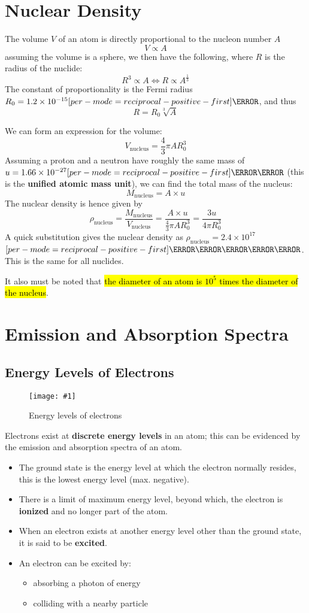 \documentclass[a4paper,12pt]{article}
\let\oldsection\section
\renewcommand\section{\clearpage\oldsection}
\let\oldsi\si
\renewcommand{\si}[1]{\oldsi[per-mode=reciprocal-positive-first]{#1}}
\newcommand{\img}[4]{\begin{center}
  \begin{figure}[H]
    \centering
    \texttt{[image: \#1]}
    \caption{#3}
    \label{fig:#4}
  \end{figure}
\end{center}}
\begin{document}
\section{Nuclear Density}

The volume $V$ of an atom is directly proportional to the nucleon number $A$
$$V \propto A$$
assuming the volume is a sphere, we then have the following, where $R$ is the radius of the nuclide:
$$R^3 \propto A \iff R \propto A^{\frac{1}{3}}$$
The constant of proportionality is the Fermi radius $R_0 = 1.2 \times 10^{-15}\si{\meter}$, and thus
$$R = R_0\sqrt[3]{A}$$

We can form an expression for the volume:
$$V_{\text{nucleus}} = \frac{4}{3}\pi A R_0^3$$
Assuming a proton and a neutron have roughly the same mass of $u = 1.66 \times 10^{-27}\si{\kilo\gram}$ (this is the \textbf{unified atomic mass unit}), we can find the total mass of the nucleus:
$$M_{\text{nucleus}} = A \times u$$
The nuclear density is hence given by
$$\rho_{\text{nucleus}} = \frac{M_{\text{nucleus}}}{V_{\text{nucleus}}} = \frac{A \times u}{\frac{4}{3}\pi A R_0^3} = \frac{3u}{4\pi R_0^3}$$
A quick substitution gives the nuclear density as $\rho_{\text{nucleus}} = 2.4 \times 10^{17}$ $\si{\kilo\gram\per\meter\cubed}$. This is the same for all nuclides.

It also must be noted that \hl{the diameter of an atom is $10^5$ times the diameter of the nucleus}.


\section{Emission and Absorption Spectra}

\subsection{Energy Levels of Electrons}

\img{energylevel.jpg}{0.5}{Energy levels of electrons}{energylevel}

Electrons exist at \textbf{discrete energy levels} in an atom; this can be evidenced by the emission and absorption spectra of an atom.
\begin{itemize}
  \item The ground state is the energy level at which the electron normally resides, this is the lowest energy level (max. negative).
  \item There is a limit of maximum energy level, beyond which, the electron is \textbf{ionized} and no longer part of the atom.
  \item When an electron exists at another energy level other than the ground state, it is said to be \textbf{excited}.
  \item An electron can be excited by:
        \begin{itemize}
          \item absorbing a photon of energy
          \item colliding with a nearby particle
        \end{itemize}
\end{itemize}
\end{document}
